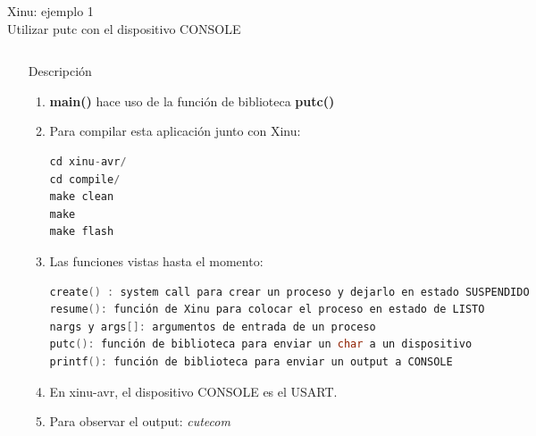 \documentclass[8pt,aspectratio=169,compress]{beamer}
\begin{document}
\begin{frame}[fragile]{Xinu: ejemplo 1 \\ Utilizar putc con el dispositivo CONSOLE}

    \begin{columns}[onlytextwidth,T]
      \column{\dimexpr\linewidth-70mm-5mm}

\begin{small}
	\begin{itemize}
\bigskip
  \item[Descripción]
\begin{enumerate}
\item \textbf{main()} hace uso de la función de biblioteca \textbf{putc()}

\bigskip
\item Para compilar esta aplicación junto con Xinu: 

\begin{lstlisting}[language=c,basicstyle=\footnotesize]
cd xinu-avr/
cd compile/
make clean
make
make flash
\end{lstlisting}
\bigskip
\item Las funciones vistas hasta el momento:

\begin{lstlisting}[language=c,basicstyle=\footnotesize]
create() : system call para crear un proceso y dejarlo en estado SUSPENDIDO
resume(): función de Xinu para colocar el proceso en estado de LISTO
nargs y args[]: argumentos de entrada de un proceso
putc(): función de biblioteca para enviar un char a un dispositivo
printf(): función de biblioteca para enviar un output a CONSOLE
\end{lstlisting}

\bigskip
\item En xinu-avr, el dispositivo CONSOLE es el USART.

\bigskip
\item Para observar el output: \textit{cutecom}
\end{enumerate}
	\end{itemize}

\end{small}

      \column{60mm}
     \includegraphics[width=62mm]{images/xinu-ejemplo1.jpg}

    \end{columns}
\end{frame}
\end{document}
